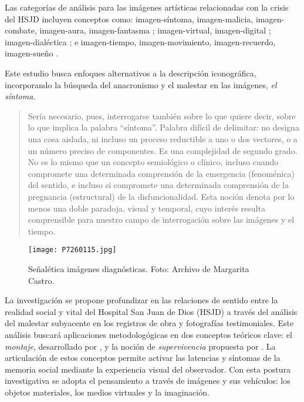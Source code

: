 Las categorías de análisis para las imágenes artísticas relacionadas con la crisis del HSJD incluyen conceptos como: imagen-síntoma, imagen-malicia, imagen-combate, imagen-aura, imagen-fantasma \parencite{DidiHuberman2011}; imagen-virtual, imagen-digital \parencite{Manovich2005}; imagen-dialéctica \parencite{Benjamin2004}; e imagen-tiempo, imagen-movimiento, imagen-recuerdo, imagen-sueño \parencite{Deleuze1985}.

Este estudio busca enfoques alternativos a la descripción iconográfica, incorporando la búsqueda del anacronismo y el malestar en las imágenes, \textit{el síntoma}.

\begin{quote}
    Sería necesario, pues, interrogarse también sobre lo que quiere decir, sobre lo que implica la palabra “síntoma”. Palabra difícil de delimitar: no designa una cosa aislada, ni incluso un proceso reductible a uno o dos vectores, o a un número preciso de componentes. Es una complejidad de segundo grado. No es lo mismo que un concepto semiológico o clínico, incluso cuando compromete una determinada comprensión de la emergencia (fenoménica) del sentido, e incluso si compromete una determinada comprensión de la pregnancia (estructural) de la disfuncionalidad. Esta noción denota por lo menos una doble paradoja, visual y temporal, cuyo interés resulta comprensible para nuestro campo de interrogación sobre las imágenes y el tiempo. \parencite[p. 63]{DidiHuberman2011}
\end{quote}

\begin{figure}[h!]
    \centering
    \texttt{[image: P7260115.jpg]}
    \caption{Señalética imágenes diagnósticas. Foto: Archivo de Margarita Castro.}
    \label{fig:senaletica_imagenes_diagnosticas}
\end{figure}

La investigación se propone profundizar en las relaciones de sentido entre la realidad social y vital del Hospital San Juan de Dios (HSJD) a través del análisis del malestar subyacente en los registros de obra y fotografías testimoniales. Este análisis buscará aplicaciones metodologógicas en dos conceptos teóricos clave: el \textit{montaje}, desarrollado por \parencite{Benjamin2004}, y la noción de \textit{supervivencia} propuesta por \parencite{Warburg2010}. La articulación de estos conceptos permite activar las latencias y síntomas de la memoria social mediante la experiencia visual del observador. Con esta postura investigativa se adopta el pensamiento a través de imágenes y sus vehículos: los objetos materiales, los medios virtuales y la imaginación.

